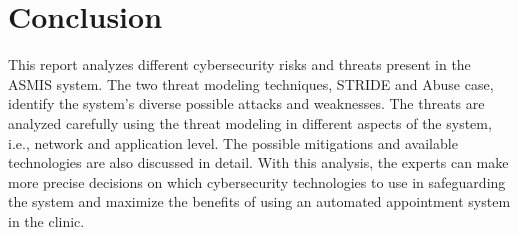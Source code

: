 \chapter{Conclusion}
This report analyzes different cybersecurity risks and threats present in the ASMIS system. The two threat modeling techniques, STRIDE and Abuse case, identify the system's diverse possible attacks and weaknesses. The threats are analyzed carefully using the threat modeling in different aspects of the system, i.e., network and application level. The possible mitigations and available technologies are also discussed in detail. With this analysis, the experts can make more precise decisions on which cybersecurity technologies to use in safeguarding the system and maximize the benefits of using an automated appointment system in the clinic.